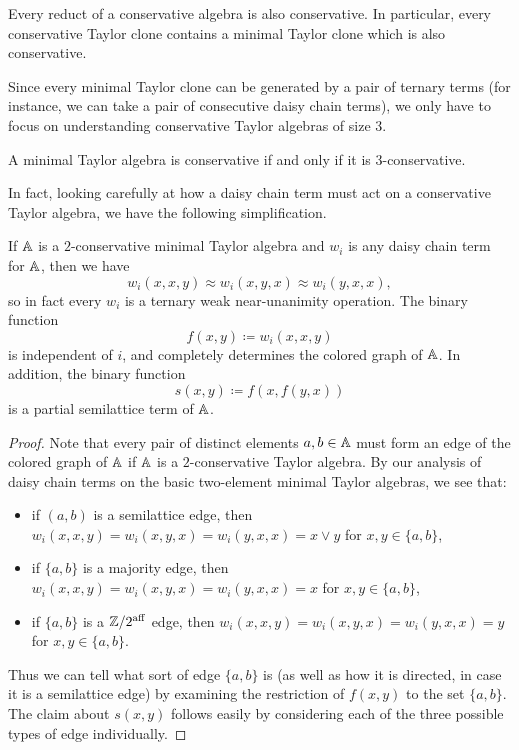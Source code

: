 \documentclass[letterpaper,11pt]{article}
\DeclareMathOperator{\aff}{aff}
\begin{document}
\begin{prop} Every reduct of a conservative algebra is also conservative. In particular, every conservative Taylor clone contains a minimal Taylor clone which is also conservative.
\end{prop}

Since every minimal Taylor clone can be generated by a pair of ternary terms (for instance, we can take a pair of consecutive daisy chain terms), we only have to focus on understanding conservative Taylor algebras of size $3$.

\begin{prop}\label{3-conservative} A minimal Taylor algebra is conservative if and only if it is $3$-conservative.
\end{prop}

In fact, looking carefully at how a daisy chain term must act on a conservative Taylor algebra, we have the following simplification.

\begin{prop}\label{conservative-ternary} If $\mathbb{A}$ is a $2$-conservative minimal Taylor algebra and $w_i$ is any daisy chain term for $\mathbb{A}$, then we have
\[
w_i(x,x,y) \approx w_i(x,y,x) \approx w_i(y,x,x),
\]
so in fact every $w_i$ is a ternary weak near-unanimity operation. The binary function
\[
f(x,y) \coloneqq w_i(x,x,y)
\]
is independent of $i$, and completely determines the colored graph of $\mathbb{A}$. In addition, the binary function
\[
s(x,y) \coloneqq f(x,f(y,x))
\]
is a partial semilattice term of $\mathbb{A}$.
\end{prop}
\begin{proof} Note that every pair of distinct elements $a,b \in \mathbb{A}$ must form an edge of the colored graph of $\mathbb{A}$ if $\mathbb{A}$ is a $2$-conservative Taylor algebra. By our analysis of daisy chain terms on the basic two-element minimal Taylor algebras, we see that:
\begin{itemize}
\item if $(a,b)$ is a semilattice edge, then $w_i(x,x,y) = w_i(x,y,x) = w_i(y,x,x) = x \vee y$ for $x,y \in \{a,b\}$,
\item if $\{a,b\}$ is a majority edge, then $w_i(x,x,y) = w_i(x,y,x) = w_i(y,x,x) = x$ for $x,y \in \{a,b\}$,
\item if $\{a,b\}$ is a $\ZZ/2^{\aff}$ edge, then $w_i(x,x,y) = w_i(x,y,x) = w_i(y,x,x) = y$ for $x,y \in \{a,b\}$.
\end{itemize}
Thus we can tell what sort of edge $\{a,b\}$ is (as well as how it is directed, in case it is a semilattice edge) by examining the restriction of $f(x,y)$ to the set $\{a,b\}$. The claim about $s(x,y)$ follows easily by considering each of the three possible types of edge individually.
\end{proof}
\end{document}
